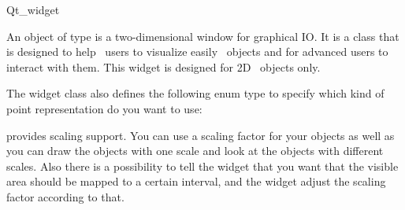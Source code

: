 
\begin{ccRefClass}{Qt_widget}

\ccDefinition

An object of type  is a two-dimensional window for
graphical IO. It is a class that is designed to help \cgal\ users
to visualize easily \cgal\ objects and for advanced users to interact
with them. This widget is designed for 2D \cgal\ objects only.


\ccInheritsFrom
{}

\ccTypes

The widget class also defines the following enum type to specify
which kind of point representation do you want to use:


\ccCreation
{}


{}


 provides scaling support. You can use a scaling factor for
your objects as well as you can draw the objects with one scale and
look at the objects with different scales. Also there is a possibility
to tell the widget that you want that the visible area should be
mapped to a certain interval, and the widget adjust the scaling factor 
according to that.



\end{ccRefClass}
